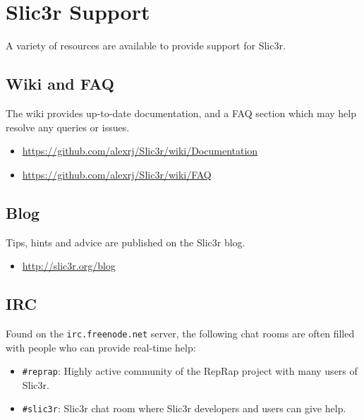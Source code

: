 \section{Slic3r Support} %
\label{sec:slic3r_support}


A variety of resources are available to provide support for Slic3r.
\subsection{Wiki and FAQ} %
\label{sub:wiki_and_faq}
The wiki provides up-to-date documentation, and a FAQ section which may help resolve any queries or issues.
\begin{itemize}
    \item \url{https://github.com/alexrj/Slic3r/wiki/Documentation}
    \item \url{https://github.com/alexrj/Slic3r/wiki/FAQ}
\end{itemize}

\subsection{Blog} %
\label{sub:blog}
Tips, hints and advice are published on the Slic3r blog.
\begin{itemize}
    \item \url{http://slic3r.org/blog}
\end{itemize}

\subsection{IRC} %
\label{sub:irc}

Found on the \texttt{irc.freenode.net} server, the following chat rooms are often filled with people who can provide real-time help:
\begin{itemize}
\item \texttt{\#reprap}: Highly active community of the RepRap project with many users of Slic3r.
\item \texttt{\#slic3r}: Slic3r chat room where Slic3r developers and users can give help.
\end{itemize}


